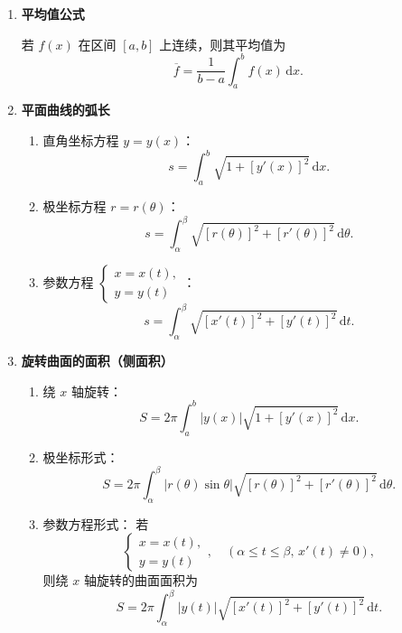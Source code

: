 \begin{enumerate}
    \item \textbf{平均值公式}

          若 $f(x)$ 在区间 $[a, b]$ 上连续，则其平均值为
          $$
              \overline{f} = \frac{1}{b - a} \int_{a}^{b} f(x) \, \mathrm{d}x.
          $$

    \item \textbf{平面曲线的弧长}
          \begin{enumerate}
              \item 直角坐标方程 $y = y(x)$：
                    $$
                        s = \int_{a}^{b} \sqrt{1 + [y'(x)]^{2}} \, \mathrm{d}x.
                    $$
              \item 极坐标方程 $r = r(\theta)$：
                    $$
                        s = \int_{\alpha}^{\beta} \sqrt{[r(\theta)]^{2} + [r'(\theta)]^{2}} \, \mathrm{d}\theta.
                    $$
              \item 参数方程 $\begin{cases} x = x(t), \\ y = y(t) \end{cases}$：
                    $$
                        s = \int_{\alpha}^{\beta} \sqrt{[x'(t)]^{2} + [y'(t)]^{2}} \, \mathrm{d}t.
                    $$
          \end{enumerate}

    \item \textbf{旋转曲面的面积（侧面积）}
          \begin{enumerate}
              \item 绕 $x$ 轴旋转：
                    $$
                        S = 2\pi \int_{a}^{b} |y(x)| \sqrt{1 + [y'(x)]^{2}} \, \mathrm{d}x.
                    $$
              \item 极坐标形式：
                    $$
                        S = 2\pi \int_{\alpha}^{\beta} |r(\theta)\sin\theta| \sqrt{[r(\theta)]^{2} + [r'(\theta)]^{2}} \, \mathrm{d}\theta.
                    $$
              \item 参数方程形式：
                    若
                    $$\begin{cases}
                            x = x(t), \\
                            y = y(t)
                        \end{cases}, \quad (\alpha \le t \le \beta,\, x'(t) \neq 0),
                    $$
                    则绕 $x$ 轴旋转的曲面面积为
                    $$
                        S = 2\pi \int_{\alpha}^{\beta} |y(t)| \sqrt{[x'(t)]^{2} + [y'(t)]^{2}} \, \mathrm{d}t.
                    $$
          \end{enumerate}
\end{enumerate}

